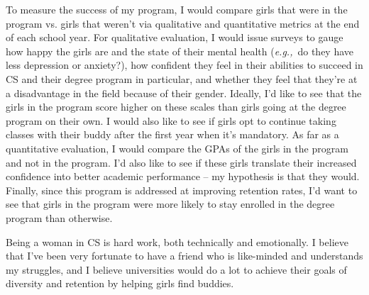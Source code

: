 \documentclass{article}
\newcommand{\eg}{{\em e.g.,}~}
\begin{document}
To measure the success of my program, I would compare girls that were in the program vs. girls that weren't via qualitative and quantitative metrics at the end of each school year.
For qualitative evaluation, I would issue surveys to gauge how happy the girls are and the state of their mental health (\eg do they have less depression or anxiety?), how confident they feel in their abilities to succeed in CS and their degree program in particular, and whether they feel that they're at a disadvantage in the field because of their gender.
Ideally, I'd like to see that the girls in the program score higher on these scales than girls going at the degree program on their own.
I would also like to see if girls opt to continue taking classes with their buddy after the first year when it's mandatory.
As far as a quantitative evaluation, I would compare the GPAs of the girls in the program and not in the program.
I'd also like to see if these girls translate their increased confidence into better academic performance -- my hypothesis is that they would.
Finally, since this program is addressed at improving retention rates, I'd want to see that girls in the program were more likely to stay enrolled in the degree program than otherwise.

Being a woman in CS is hard work, both technically and emotionally.
I believe that I've been very fortunate to have a friend who is like-minded and understands my struggles, and I believe universities would do a lot to achieve their goals of diversity and retention by helping girls find buddies.
\end{document}
